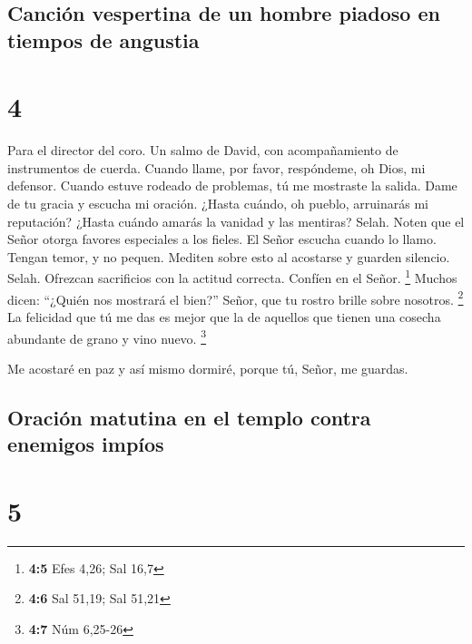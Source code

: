 \hypertarget{canciuxf3n-vespertina-de-un-hombre-piadoso-en-tiempos-de-angustia}{%
\subsection{Canción vespertina de un hombre piadoso en tiempos de
angustia}\label{canciuxf3n-vespertina-de-un-hombre-piadoso-en-tiempos-de-angustia}}

\hypertarget{section-3}{%
\section{4}\label{section-3}}

Para el director del coro. Un salmo de David, con acompañamiento de
instrumentos de cuerda.  Cuando llame, por favor,
respóndeme, oh Dios, mi defensor. Cuando estuve rodeado de problemas, tú
me mostraste la salida. Dame de tu gracia y escucha mi oración.
 ¿Hasta cuándo, oh pueblo, arruinarás mi reputación? ¿Hasta
cuándo amarás la vanidad y las mentiras? Selah.  Noten que
el Señor otorga favores especiales a los fieles. El Señor escucha cuando
lo llamo.  Tengan temor, y no pequen. Mediten sobre esto al
acostarse y guarden silencio. Selah.  Ofrezcan sacrificios
con la actitud correcta. Confíen en el Señor. \footnote{\textbf{4:5}
  Efes 4,26; Sal 16,7}  Muchos dicen: ``¿Quién nos mostrará
el bien?'' Señor, que tu rostro brille sobre nosotros. \footnote{\textbf{4:6}
  Sal 51,19; Sal 51,21}  La felicidad que tú me das es mejor
que la de aquellos que tienen una cosecha abundante de grano y vino
nuevo. \footnote{\textbf{4:7} Núm 6,25-26}

 Me acostaré en paz y así mismo dormiré, porque tú, Señor,
me guardas.

\hypertarget{oraciuxf3n-matutina-en-el-templo-contra-enemigos-impuxedos}{%
\subsection{Oración matutina en el templo contra enemigos
impíos}\label{oraciuxf3n-matutina-en-el-templo-contra-enemigos-impuxedos}}

\hypertarget{section-4}{%
\section{5}\label{section-4}}

